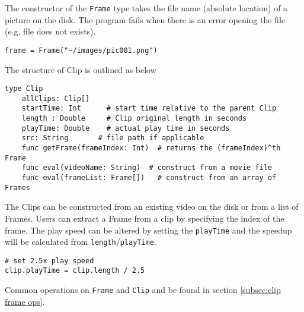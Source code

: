 \documentclass[11pt]{article}
\begin{document}
The constructor of the \texttt{Frame} type takes the file name (absolute location) of a picture on the disk. The program fails when there is an error opening the file (e.g. file does not exists).

\begin{lstlisting}
frame = Frame("~/images/pic001.png")
\end{lstlisting}

The structure of Clip is outlined as below
\begin{lstlisting}
type Clip
    allClips: Clip[]
    startTime: Int      # start time relative to the parent Clip
    length : Double     # Clip original length in seconds
    playTime: Double    # actual play time in seconds
    src: String       # file path if applicable
    func getFrame(frameIndex: Int)  # returns the (frameIndex)^th Frame
    func eval(videoName: String)  # construct from a movie file
    func eval(frameList: Frame[])   # construct from an array of Frames
\end{lstlisting}

The Clips can be constructed from an existing video on the disk or from a list of Frames. Users can extract a Frame from a clip by specifying the index of the frame. The play speed can be altered by setting the \texttt{playTime} and the speedup will be calculated from  \texttt{length}/\texttt{playTime}.

\begin{lstlisting}
# set 2.5x play speed
clip.playTime = clip.length / 2.5
\end{lstlisting}

Common operations on \texttt{Frame} and \texttt{Clip} and be found in section \ref{subsec:clip frame ops}.
\end{document}
